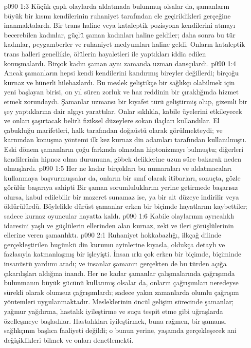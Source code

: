 \vs p090 1:3 Küçük çaplı olaylarda aldatmada bulunmuş olsalar da, şamanların büyük bir kısmı kendilerinin ruhaniyet tarafından ele geçirildikleri gerçeğine inanmaktalardı. Bir trans haline veya kataleptik pozisyona kendilerini atmayı becerebilen kadınlar, güçlü şaman kadınları haline geldiler; daha sonra bu tür kadınlar, peygamberler ve ruhaniyet medyumları haline geldi. Onların kataleptik trans halleri genellikle, ölülerin hayaletleri ile yaptıkları iddia edilen konuşmalardı. Birçok kadın şaman aynı zamanda uzman dansçılardı.
\vs p090 1:4 Ancak şamanların hepsi kendi kendilerini kandırmış bireyler değillerdi; birçoğu kurnaz ve hünerli hilebazlardı. Bu meslek geliştikçe bir sağlıkçı olabilmek için yeni başlayan birisi, on yıl süren zorluk ve haz reddinin bir çıraklığında hizmet etmek zorundaydı. Şamanlar uzmansı bir kıyafet türü geliştirmiş olup, gizemli bir şey yaptıklarına dair algıyı yarattılar. Onlar sıklıkla, kabile üyelerini etkileyecek ve onları şaşırtacak belirli fiziksel düzeylere sokan ilaçları kullandılar. El çabukluğu marifetleri, halk tarafından doğaüstü olarak görülmekteydi; ve karnından konuşma yöntemi ilk kez kurnaz din adamları tarafından kullanılmıştı. Eski dönem şamanların çoğu farkında olmadan hiptonizmayı bulmuştu; diğerleri kendilerinin hipnoz olma durumuna, göbek deliklerine uzun süre bakarak neden olmuşlardı.
\vs p090 1:5 Her ne kadar birçokları bu numaraları ve aldatmacaları kullanmaya başvurmuşsalar da, onların bir sınıf olarak itibarları, sonuçta, gözle görülür başarıya sahipti Bir şaman sorumluluklarını yerine getirmede başarısız olursa, kabul edilebilir bir mazeret sunamaz ise, ya bir alt düzeye indirilir veya öldürülürdü. Böylelikle dürüst şamanlar erken bir biçimde hayatlarını kaybettiler; sadece kurnaz oyuncular hayatta kaldı.
\vs p090 1:6 Kabile olaylarının ayrıcalıklı idaresini yaşlı ve güçlülerin ellerinden alan kurnaz, zeki ve ileri görüşlülerinin ellerine veren şamanlıktı.
\vs p090 2:1 Ruhaniyet hokkabazlığı, ilkçağ dilinde gerçekleştirilen bugünkü din kurumu ayinlerine kıyasla, oldukça detaylı ve fazlasıyla katmanlaşmış bir işleyişti. İnsan ırkı çok erken bir biçimde,  biçiminde insanüstü yardımı aradı; ve insanlar şamanın gerçekten de bu türden açığa çıkarılışları aldığına inandı. Her ne kadar şamanlar çalışmalarında çağrışımda bulunmanın büyük gücünü kullanmış olsalar da, onların çağrışımları neredeyse sürekli olarak olumsuz çağrışımlardı; sadece yakın zamanlarda olumlu çağrışım yöntemleri uygulanmaktadır. Mesleklerinin öncül gelişim sürecinde şamanlar; yağmur yağdırma, hastalık iyileştirme ve suçu tespit etme gibi uğraşlarda özelleşmeye başladılar. Hastalıkları iyileştirmek, buna rağmen, bir şamansı sağlıkçının başlıca faaliyeti değildi; o bunun yerine, yaşamda gerçekleşecek ani değişiklikleri bilmek ve onları denetlemekti.
